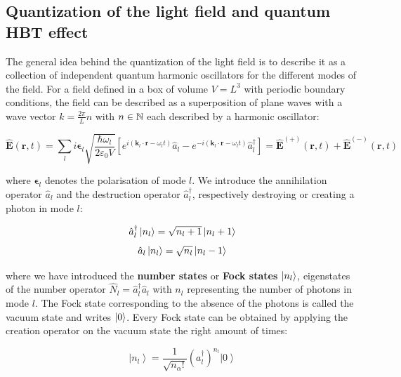 \subsection{Quantization of the light field and quantum HBT effect}

The general idea behind the quantization of the light field is to describe it as a collection of independent quantum harmonic oscillators for the different modes of the field. For a field defined in a box of volume $V=L^3$ with periodic boundary conditions, the field can be described as a superposition of plane waves with a wave vector $k=\frac{2 \pi}{L} n$ with $n \in \mathbb{N}$ each described by a harmonic oscillator:

\begin{equation}
    \hat{\bm{E}}(\bm{r}, t)=\sum_{l} i \bm{\epsilon}_{l} \sqrt{\frac{\hbar \omega_l}{2 \varepsilon_0 V}} \left[e^{i (\bm{k}_{l} \cdot \bm{r} - \omega_l t)} \hat{a}_{l}-e^{-i (\bm{k}_{l} \cdot \bm{r} - \omega_l t)} \hat{a}_{l}^{\dagger}\right]  = \hat{\bm{E}}^{(+)}(\bm{r}, t)+\hat{\bm{E}}^{(-)}(\bm{r}, t)
\end{equation}

\noindent where $\bm{\epsilon}_{l}$ denotes the polarisation of mode $l$. We introduce the annihilation operator $\hat{a}_{l}$ and the destruction operator $\hat{a}_{l}^{\dagger}$, respectively destroying or creating a photon in mode $l$:

\begin{equation}
    \hat{a}_{l}^{\dagger} \ket{n_l}=\sqrt{n_l+1}\left|n_l+1\right\rangle
\end{equation}
\begin{equation}
    \hat{a}_{l} \ket{n_l}=\sqrt{n_l}\left|n_l-1\right\rangle
\end{equation}

\noindent where we have introduced the \textbf{number states} or \textbf{Fock states} $\ket{n_l}$, eigenstates of the number operator $\hat{N}_l = \hat{a}_{l}^{\dagger} \hat{a}_{l}$ with $n_l$ representing the number of photons in mode $l$. The Fock state corresponding to the absence of the photons is called the vacuum state and writes $\ket{0}$. Every Fock state can be obtained by applying the creation operator on the vacuum state the right amount of times:

\begin{equation}
    \left|n_{l}\right\rangle=\frac{1}{\sqrt{n_{\alpha} !}}\left(a_{l}^{\dagger}\right)^{n_{l}}\left|0\right\rangle
\end{equation}



